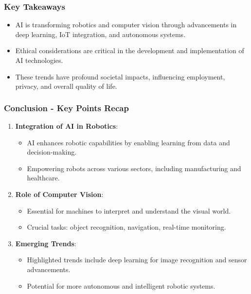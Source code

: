 \documentclass[aspectratio=169]{beamer}
\begin{document}
\begin{frame}[fragile]
    \frametitle{Key Takeaways}
    \begin{itemize}
        \item AI is transforming robotics and computer vision through advancements in deep learning, IoT integration, and autonomous systems.
        \item Ethical considerations are critical in the development and implementation of AI technologies.
        \item These trends have profound societal impacts, influencing employment, privacy, and overall quality of life.
    \end{itemize}
\end{frame}

\begin{frame}[fragile]
    \frametitle{Conclusion - Key Points Recap}
    
    \begin{enumerate}
        \item \textbf{Integration of AI in Robotics}:
        \begin{itemize}
            \item AI enhances robotic capabilities by enabling learning from data and decision-making.
            \item Empowering robots across various sectors, including manufacturing and healthcare.
        \end{itemize}
        
        \item \textbf{Role of Computer Vision}:
        \begin{itemize}
            \item Essential for machines to interpret and understand the visual world.
            \item Crucial tasks: object recognition, navigation, real-time monitoring.
        \end{itemize}
        
        \item \textbf{Emerging Trends}:
        \begin{itemize}
            \item Highlighted trends include deep learning for image recognition and sensor advancements.
            \item Potential for more autonomous and intelligent robotic systems.
        \end{itemize}
    \end{enumerate}
\end{frame}
\end{document}
